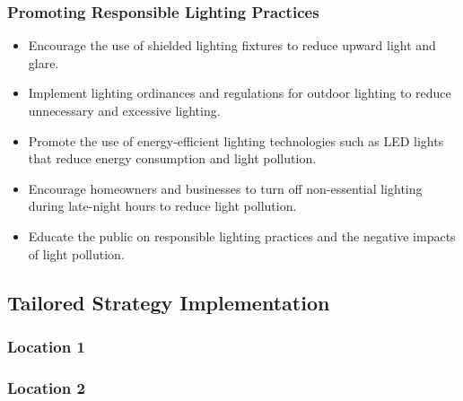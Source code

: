 \subsubsection{Promoting Responsible Lighting Practices}
\begin{itemize}
    \item Encourage the use of shielded lighting fixtures to reduce upward light and glare.
    
    \item Implement lighting ordinances and regulations for outdoor lighting to reduce unnecessary and excessive lighting.
    
    \item Promote the use of energy-efficient lighting technologies such as LED lights that reduce energy consumption and light pollution.
    
    \item Encourage homeowners and businesses to turn off non-essential lighting during late-night hours to reduce light pollution.
    
    \item Educate the public on responsible lighting practices and the negative impacts of light pollution.
\end{itemize}



\subsection{Tailored Strategy Implementation}

\subsubsection{Location 1}

\subsubsection{Location 2}


